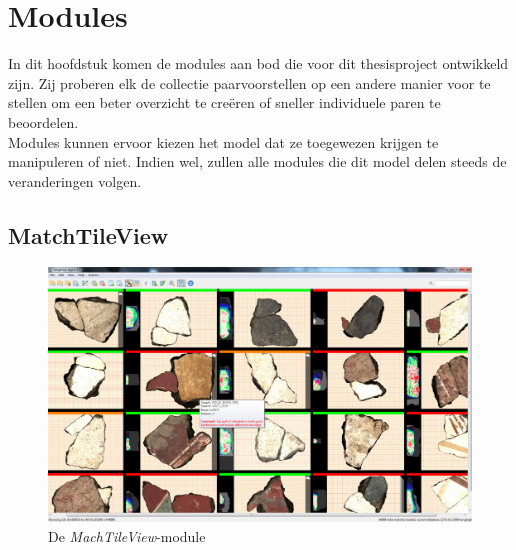 \chapter{Modules}
\label{hoofdstuk:modules}
In dit hoofdstuk komen de modules aan bod die voor dit thesisproject ontwikkeld zijn. Zij proberen elk de collectie paarvoorstellen op een andere manier voor te stellen om een beter overzicht te cre\"eren of sneller individuele paren te beoordelen.\\

Modules kunnen ervoor kiezen het model dat ze toegewezen krijgen te manipuleren of niet. Indien wel, zullen alle modules die dit model delen steeds de veranderingen volgen.

\section{MatchTileView}

\begin{figure}[!h]
	\begin{center}
		\includegraphics[width=1.0\columnwidth]{images/matchtileview-nice-01.png}
		\caption{De \emph{MachTileView}-module}
		\label{fig:mtv1}
	\end{center}
\end{figure}

